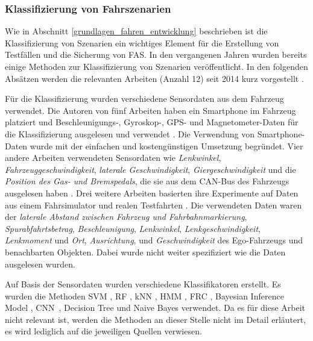 \subsubsection{Klassifizierung von Fahrszenarien}

Wie in Abschnitt \ref{grundlagen_fahren_entwicklung} beschrieben ist die Klassifizierung von Szenarien ein wichtiges Element für die Erstellung von Testfällen und die Sicherung von \ac{FAS}. In den vergangenen Jahren wurden bereits einige Methoden zur Klassifizierung von Szenarien veröffentlicht. In den folgenden Absätzen werden die relevanten Arbeiten (Anzahl 12) seit 2014 kurz vorgestellt .

Für die Klassifizierung wurden verschiedene Sensordaten aus dem Fahrzeug verwendet. Die Autoren von fünf Arbeiten haben ein Smartphone im Fahrzeug platziert  und Beschleunigungs-, Gyroskop-, GPS- und Magnetometer-Daten für die Klassifizierung ausgelesen und verwendet \cite{xie2018driving, cervantes2016vehicle, woo2016manoeuvre, camlica2016feature, arroyo2016adaptive}. Die Verwendung von Smartphone-Daten wurde mit der einfachen und kostengünstigen Umsetzung begründet. Vier andere Arbeiten verwendeten Sensordaten wie \textit{Lenkwinkel}, \textit{Fahrzeuggeschwindigkeit}, \textit{laterale Geschwindigkeit}, \textit{Giergeschwindigkeit} und die \textit{Position des Gas- und Bremspedals}, die sie aus dem CAN-Bus des Fahrzeugs ausgelesen haben \cite{zheng2017lane, zheng2015non, li2015lane, zheng2014threshold}. Drei weitere Arbeiten basierten ihre Experimente auf Daten aus einem Fahrsimulator \cite{sun2017robust, zheng2016drivers} und realen Testfahrten \cite{gruner2017spatiotemporal}. Die verwendeten Daten waren der \textit{laterale Abstand zwischen Fahrzeug und Fahrbahnmarkierung}, \textit{Spurabfahrtsbetrag}, \textit{Beschleunigung}, \textit{Lenkwinkel}, \textit{Lenkgeschwindigkeit}, \textit{Lenkmoment} und \textit{Ort}, \textit{Ausrichtung}, und \textit{Geschwindigkeit} des Ego-Fahrzeugs und benachbarten Objekten. Dabei wurde nicht weiter spezifiziert wie die Daten ausgelesen wurden.

Auf Basis der Sensordaten wurden verschiedene Klassifikatoren erstellt. Es wurden die Methoden \ac{SVM} \cite{sun2017robust, cervantes2016vehicle, woo2016manoeuvre, camlica2016feature, zheng2016drivers, zheng2015non}, \ac{RF} \cite{xie2018driving, cervantes2016vehicle, zheng2016drivers}, \ac{kNN} \cite{zheng2017lane, camlica2016feature, zheng2016drivers}, \ac{HMM} \cite{zheng2017lane, li2015lane}, \ac{FRC} \cite{cervantes2016vehicle, arroyo2016adaptive}, Bayesian Inference Model \cite{sun2017robust}, \ac{CNN} \cite{gruner2017spatiotemporal}, Decision Tree \cite{zheng2014threshold} und Naive Bayes \cite{camlica2016feature} verwendet. Da es für diese Arbeit nicht relevant ist, werden die Methoden an dieser Stelle nicht im Detail erläutert, es wird lediglich auf die jeweiligen Quellen verwiesen.

